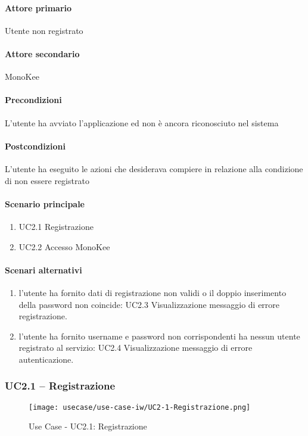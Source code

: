 \paragraph{Attore primario}  Utente non registrato
\paragraph{Attore secondario}  MonoKee
\paragraph{Precondizioni}  L’utente ha avviato l’applicazione ed non è ancora riconosciuto nel sistema
\paragraph{Postcondizioni}  L’utente ha eseguito le azioni che desiderava compiere in relazione alla condizione di non essere registrato
\paragraph{Scenario principale}  
    \begin{enumerate}
        \item UC2.1 Registrazione
        \item UC2.2 Accesso MonoKee
    \end{enumerate}
\paragraph{Scenari alternativi}  
    \begin{enumerate}
        \item l’utente ha fornito dati di registrazione non validi o il doppio inserimento della password non coincide: UC2.3 Visualizzazione messaggio di errore registrazione.
        \item l’utente ha fornito username e password non corrispondenti ha nessun utente registrato al servizio: UC2.4 Visualizzazione messaggio di errore autenticazione.
    \end{enumerate}


\subsubsection{UC2.1 – Registrazione}
\begin{figure}[!htbp] 
    \centering 
    \texttt{[image: usecase/use-case-iw/UC2-1-Registrazione.png]} 
    \caption{Use Case - UC2.1: Registrazione}
\end{figure}


